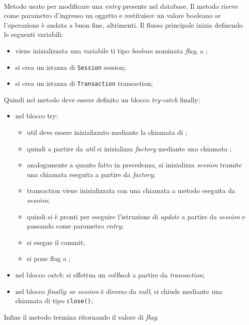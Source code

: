 \begin{description}
	\item{}\\
	Metodo usato per modificare una \textit{entry} presente nel database. Il metodo riceve come parametro d'ingresso un oggetto  e restituisce un valore booleano  se l'operazione è andata a buon fine,  altrimenti. Il flusso principale inizia definendo le seguenti variabili:
	\begin{itemize}
		\item viene inizializzata una variabile ti tipo \textit{boolean} nominata \textit{flag}, a ;
		\item si crea un istanza di \texttt{Session} session;
		\item si crea un istanza di \texttt{Transaction} transaction;
	\end{itemize}
	Quindi nel metodo deve essere definito un blocco \textit{try-catch} finally:
	\begin{itemize}
		\item nel blocco try:
		\begin{itemize}
			\item util deve essere inizializzato mediante la chiamata  di ;
			\item quindi a partire da \textit{util} si inizializza \textit{factory} mediante una chiamata ;
			\item analogamente a quanto fatto in precedenza, si inizializza \textit{session} tramite una chiamata  eseguita a partire da \textit{factory};
			\item transaction viene inizializzata con una chiamata a metodo  eseguita da \textit{session};
			\item quindi si è pronti per eseguire l'istruzione di \textit{update} a partire da \textit{session} e passando come parametro \textit{entry};
			\item si esegue il commit;
			\item si pone flag a ;
		\end{itemize}
		\item nel blocco \textit{catch}: si effettua un \textit{rollback} a partire da \textit{transaction};
		\item nel blocco \textit{finally}: se \textit{session} è diverso da \textit{null}, si chiude mediante una chiamata di tipo \texttt{close()};
	\end{itemize}
	Infine il metodo termina ritornando il valore di \textit{flag};	
	

\end{description}
